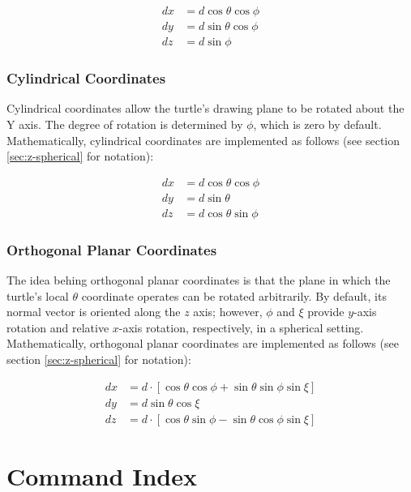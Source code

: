 \documentclass{article}
\begin{document}
	\begin{align*}
	  dx & = d \cos \theta \cos \phi \\
	  dy & = d \sin \theta \cos \phi \\
	  dz & = d \sin \phi
	\end{align*}

      \subsubsection{Cylindrical Coordinates}
	\label{sec:y-cylindrical}
	\label{sec:cylindrical-coordinates}

	Cylindrical coordinates allow the turtle's drawing plane to be rotated
	about the Y axis. The degree of rotation is determined by $\phi$, which is
	zero by default. Mathematically, cylindrical coordinates are implemented
	as follows (see section \ref{sec:z-spherical} for notation):

	\begin{align*}
	  dx & = d \cos \theta \cos \phi \\
	  dy & = d \sin \theta \\
	  dz & = d \cos \theta \sin \phi
	\end{align*}

      \subsubsection{Orthogonal Planar Coordinates}
	\label{sec:orthogonal-planar}

	The idea behing orthogonal planar coordinates is that the plane in which
	the turtle's local $\theta$ coordinate operates can be rotated
	arbitrarily. By default, its normal vector is oriented along the $z$ axis;
	however, $\phi$ and $\xi$ provide $y$-axis rotation and relative $x$-axis
	rotation, respectively, in a spherical setting. Mathematically, orthogonal
	planar coordinates are implemented as follows (see section
	\ref{sec:z-spherical} for notation):

	\begin{align*}
	  dx & = d \cdot [\cos\theta \cos\phi + \sin\theta \sin\phi \sin\xi] \\
	  dy & = d \sin\theta \cos\xi \\
	  dz & = d \cdot [\cos\theta \sin\phi - \sin\theta \cos\phi \sin\xi]
	\end{align*}

  \section{Command Index}
    \label{sec:command-index}
\end{document}
